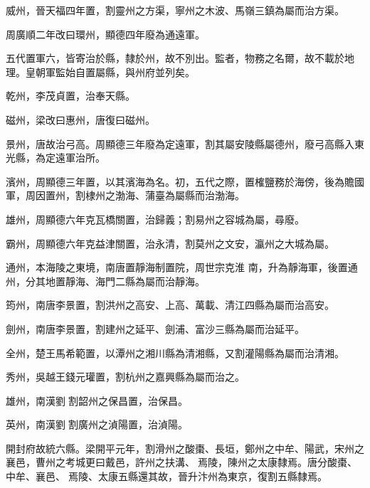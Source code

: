\begin{pinyinscope}
 威州，晉天福四年置，割靈州之方渠，寧州之木波、馬嶺三鎮為屬而治方渠。



 周廣順二年改曰環州，顯德四年廢為通遠軍。



 五代置軍六，皆寄治於縣，隸於州，故不別出。監者，物務之名爾，故不載於地理。皇朝軍監始自置屬縣，與州府並列矣。



 乾州，李茂貞置，治奉天縣。



 磁州，梁改曰惠州，唐復曰磁州。



 景州，唐故治弓高。周顯德三年廢為定遠軍，割其屬安陵縣屬德州，廢弓高縣入東光縣，為定遠軍治所。



 濱州，周顯德三年置，以其濱海為名。初，五代之際，置榷鹽務於海傍，後為贍國軍，周因置州，割棣州之渤海、蒲臺為屬縣而治渤海。



 雄州，周顯德六年克瓦橋關置，治歸義；割易州之容城為屬，尋廢。



 霸州，周顯德六年克益津關置，治永清，割莫州之文安，瀛州之大城為屬。



 通州，本海陵之東境，南唐置靜海制置院，周世宗克淮
 南，升為靜海軍，後置通州，分其地置靜海、海門二縣為屬而治靜海。



 筠州，南唐李景置，割洪州之高安、上高、萬載、清江四縣為屬而治高安。



 劍州，南唐李景置，割建州之延平、劍浦、富沙三縣為屬而治延平。



 全州，楚王馬希範置，以潭州之湘川縣為清湘縣，又割灌陽縣為屬而治清湘。



 秀州，吳越王錢元瓘置，割杭州之嘉興縣為屬而治之。



 雄州，南漢劉割韶州之保昌置，治保昌。



 英州，南漢劉割廣州之湞陽置，治湞陽。



 開封府故統六縣。梁開平元年，割滑州之酸棗、長垣，鄭州之中牟、陽武，宋州之襄邑，曹州之考城更曰戴邑，許州之扶溝、焉陵，陳州之太康隸焉。唐分酸棗、中牟、襄邑、焉陵、太康五縣還其故，晉升汴州為東京，復割五縣隸焉。




\end{pinyinscope}
